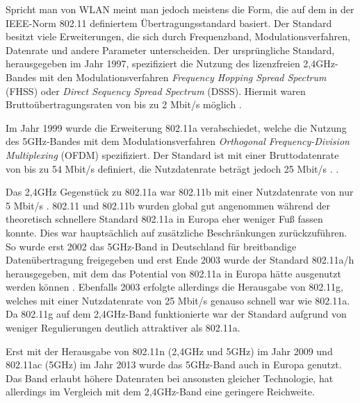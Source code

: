 \documentclass[10pt]{scrartcl}
\begin{document}
Spricht man von WLAN meint man jedoch meistens die Form, die auf dem in der IEEE-Norm 802.11 definiertem Übertragungsstandard \cite[siehe][]{ieeewlan} basiert. Der Standard besitzt viele Erweiterungen, die sich durch Frequenzband, Modulationsverfahren, Datenrate und andere Parameter unterscheiden. Der ursprüngliche Standard, herausgegeben im Jahr 1997, spezifiziert die Nutzung des lizenzfreien 2,4GHz-Bandes mit den Modulationsverfahren \textit{Frequency Hopping Spread Spectrum} (FHSS) oder \textit{Direct Sequency Spread Spectrum} (DSSS). Hiermit waren Bruttoübertragungsraten von bis zu 2 Mbit/s möglich \cite{welotec}.

Im Jahr 1999 wurde die Erweiterung 802.11a verabschiedet, welche die Nutzung des 5GHz-Bandes mit dem Modulationsverfahren \textit{Orthogonal Frequency-Division Multiplexing} (OFDM) spezifiziert. Der Standard ist mit einer Bruttodatenrate von bis zu 54 Mbit/s definiert, die Nutzdatenrate beträgt jedoch 25 Mbit/s \cite[vgl.][]{avmnutzdaten}.  \cite{avmnutzdaten}.

Das 2,4GHz Gegenstück zu 802.11a war 802.11b mit einer Nutzdatenrate von nur 5 Mbit/s \cite{avmnutzdaten}. 802.11 und 802.11b wurden global gut angenommen während der theoretisch schnellere Standard 802.11a in Europa eher weniger Fuß fassen konnte. Dies war hauptsächlich auf zusätzliche Beschränkungen zurückzuführen. So wurde erst 2002 das 5GHz-Band in Deutschland für breitbandige Datenübertragung freigegeben und erst Ende 2003 wurde der Standard 802.11a/h herausgegeben, mit dem das Potential von 802.11a in Europa hätte ausgenutzt werden können \cite[vgl.][]{jreich}. Ebenfalls 2003 erfolgte allerdings die Herausgabe von 802.11g, welches mit einer Nutzdatenrate von 25 Mbit/s \cite{avmnutzdaten} genauso schnell war wie 802.11a. Da 802.11g auf dem 2,4GHz-Band funktionierte war der Standard aufgrund von weniger Regulierungen deutlich attraktiver als 802.11a.

Erst mit der Herausgabe von 802.11n (2,4GHz und 5GHz) im Jahr 2009 und 802.11ac (5GHz) im Jahr 2013 wurde das 5GHz-Band auch in Europa genutzt. Das Band erlaubt höhere Datenraten bei ansonsten gleicher Technologie, hat allerdings im Vergleich mit dem 2,4GHz-Band eine geringere Reichweite.
\end{document}

